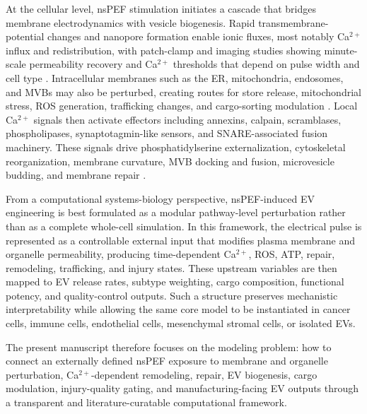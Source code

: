 \documentclass[Afour,sagev,times]{sagej}
\begin{document}
At the cellular level, nsPEF stimulation initiates a cascade that bridges membrane electrodynamics with vesicle biogenesis. Rapid transmembrane-potential changes and nanopore formation enable ionic fluxes, most notably Ca$^{2+}$ influx and redistribution, with patch-clamp and imaging studies showing minute-scale permeability recovery and Ca$^{2+}$ thresholds that depend on pulse width and cell type \cite{pakhomov2007membrane,pakhomov2007long,nesin2012cell,semenov2013primary}. Intracellular membranes such as the ER, mitochondria, endosomes, and MVBs may also be perturbed, creating routes for store release, mitochondrial stress, ROS generation, trafficking changes, and cargo-sorting modulation \cite{semenov2013recruitment,beebe2012transient,napotnik2012mitochondrial}. Local Ca$^{2+}$ signals then activate effectors including annexins, calpain, scramblases, phospholipases, synaptotagmin-like sensors, and SNARE-associated fusion machinery. These signals drive phosphatidylserine externalization, cytoskeletal reorganization, membrane curvature, MVB docking and fusion, microvesicle budding, and membrane repair \cite{muratori2017activation,bhattacharya2022calcium,williams2023annexin,muratori2021role}.

From a computational systems-biology perspective, nsPEF-induced EV engineering is best formulated as a modular pathway-level perturbation rather than as a complete whole-cell simulation. In this framework, the electrical pulse is represented as a controllable external input that modifies plasma membrane and organelle permeability, producing time-dependent Ca$^{2+}$, ROS, ATP, repair, remodeling, trafficking, and injury states. These upstream variables are then mapped to EV release rates, subtype weighting, cargo composition, functional potency, and quality-control outputs. Such a structure preserves mechanistic interpretability while allowing the same core model to be instantiated in cancer cells, immune cells, endothelial cells, mesenchymal stromal cells, or isolated EVs.

The present manuscript therefore focuses on the modeling problem: how to connect an externally defined nsPEF exposure to membrane and organelle perturbation, Ca$^{2+}$-dependent remodeling, repair, EV biogenesis, cargo modulation, injury-quality gating, and manufacturing-facing EV outputs through a transparent and literature-curatable computational framework.
\end{document}
